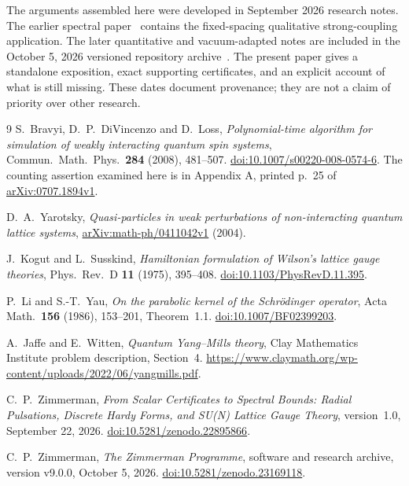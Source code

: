 \documentclass[11pt]{article}
\theoremstyle{definition}
\theoremstyle{remark}
\numberwithin{equation}{section}
\begin{document}
The arguments assembled here were developed in September 2026 research
notes. The earlier spectral paper~\cite{Spectral} contains the
fixed-spacing qualitative strong-coupling application. The later
quantitative and vacuum-adapted notes are included in the October 5,
2026 versioned repository archive~\cite{Archive}. The present paper gives
a standalone exposition, exact supporting certificates, and an explicit
account of what is still missing. These dates document provenance;
they are not a claim of priority over other research.






\begin{thebibliography}{9}
S.~Bravyi, D.~P.~DiVincenzo and D.~Loss,
\emph{Polynomial-time algorithm for simulation of weakly interacting
quantum spin systems},
Commun.\ Math.\ Phys.\ \textbf{284} (2008), 481--507.
\href{https://doi.org/10.1007/s00220-008-0574-6}{doi:10.1007/s00220-008-0574-6}.
The counting assertion examined here is in Appendix A, printed p.~25 of
\href{https://arxiv.org/abs/0707.1894v1}{arXiv:0707.1894v1}.

D.~A.~Yarotsky,
\emph{Quasi-particles in weak perturbations of non-interacting quantum
lattice systems},
\href{https://arxiv.org/abs/math-ph/0411042v1}{arXiv:math-ph/0411042v1} (2004).

J.~Kogut and L.~Susskind,
\emph{Hamiltonian formulation of Wilson's lattice gauge theories},
Phys.\ Rev.\ D \textbf{11} (1975), 395--408.
\href{https://doi.org/10.1103/PhysRevD.11.395}{doi:10.1103/PhysRevD.11.395}.

P.~Li and S.-T.~Yau,
\emph{On the parabolic kernel of the Schr\"odinger operator},
Acta Math.\ \textbf{156} (1986), 153--201, Theorem~1.1.
\href{https://doi.org/10.1007/BF02399203}{doi:10.1007/BF02399203}.

A.~Jaffe and E.~Witten,
\emph{Quantum Yang--Mills theory},
Clay Mathematics Institute problem description, Section~4.
\url{https://www.claymath.org/wp-content/uploads/2022/06/yangmills.pdf}.

C.~P.~Zimmerman,
\emph{From Scalar Certificates to Spectral Bounds: Radial Pulsations,
Discrete Hardy Forms, and SU(N) Lattice Gauge Theory}, version~1.0,
September 22, 2026.
\href{https://doi.org/10.5281/zenodo.22895866}{doi:10.5281/zenodo.22895866}.

C.~P.~Zimmerman,
\emph{The Zimmerman Programme}, software and research archive,
version v9.0.0, October 5, 2026.
\href{https://doi.org/10.5281/zenodo.23169118}{doi:10.5281/zenodo.23169118}.
\end{thebibliography}
\end{document}
